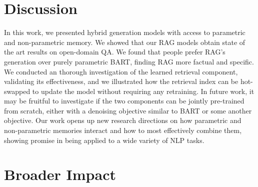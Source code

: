 \documentclass{article}
\begin{document}
\section{Discussion}

In this work, we presented hybrid generation models with access to parametric and non-parametric memory.
We showed that our RAG models obtain state of the art results on open-domain QA. We found that people prefer RAG's generation over purely parametric BART, finding RAG more factual and specific.
We conducted an thorough investigation of the learned retrieval component, validating its effectiveness, and we illustrated how the retrieval index can be hot-swapped to update the model without requiring any retraining.
In future work, it may be fruitful to investigate if the two components can be jointly pre-trained from scratch, either with a denoising objective similar to BART or some another objective. 
Our work opens up new research directions on how parametric and non-parametric memories interact and how to most effectively combine them, showing promise in being applied to a wide variety of NLP tasks.






\clearpage 
\section*{Broader Impact}
\end{document}
